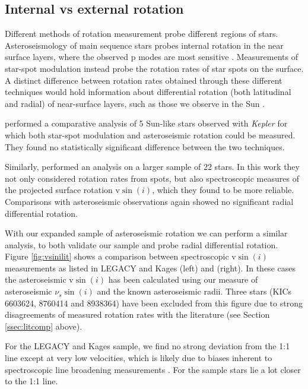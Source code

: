 \documentclass[12pt]{article}
\newcommand{\kepler}{\emph{Kepler}\xspace}
\begin{document}
\subsection{Internal vs external rotation}
Different methods of rotation measurement probe different regions of stars. Asteroseismology of main sequence stars probes internal rotation in the near surface layers, where the observed p modes are most sensitive \cite{lund+2014}. Measurements of star-spot modulation instead probe the rotation rates of star spots on the surface. A distinct difference between rotation rates obtained through these different techniques would hold information about differential rotation (both latitudinal and radial) of near-surface layers, such as those we observe in the Sun \cite{beck2000}. 

\cite{nielsen+2015} performed a comparative analysis of 5 Sun-like stars observed with \kepler for which both star-spot modulation and asteroseismic rotation could be measured. They found no statistically significant difference between the two techniques.

Similarly, \cite{benomar+2015} performed an analysis on a larger sample of 22 stars. In this work they not only considered rotation rates from spots, but also spectroscopic measures of the projected surface rotation $\textrm{v}\sin(i)$, which they found to be more reliable. Comparisons with asteroseismic observations again showed no significant radial differential rotation.

With our expanded sample of asteroseismic rotation we can perform a similar analysis, to both validate our sample and probe radial differential rotation. Figure \ref{fig:vsinilit} shows a comparison between spectroscopic $\textrm{v}\sin(i)$ measurements as listed in LEGACY and Kages (left) and \cite{benomar+2015} (right). In these cases the asteroseismic $\textrm{v}\sin(i)$ has been calculated using our measure of asteroseismic $\nu_s\sin(i)$ and the known asteroseismic radii. Three stars (KICs 6603624, 8760414 and 8938364) have been excluded from this figure due to strong disagreements of measured rotation rates with the literature (see Section \ref{ssec:litcomp} above).

For the LEGACY and Kages sample, we find no strong deviation from the 1:1 line except at very low velocities, which is likely due to biases inherent to spectroscopic line broadening measurements \cite{doyle+2014, tayar+2015}. For the \cite{benomar+2015} sample stars lie a lot closer to the 1:1 line.
\end{document}
